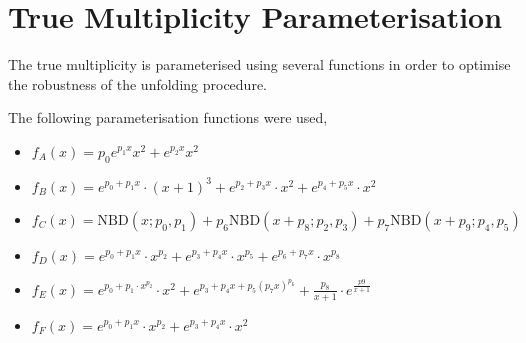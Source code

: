 \section{True Multiplicity Parameterisation}
\label{section: true multiplicity parameterisation}

The true multiplicity is parameterised using several functions in order to optimise the robustness of the unfolding procedure.

The following parameterisation functions were used,

\begin{itemize}
	\item $f_A(x) = p_0 e^{p_1x}x^2 + e^{p_2x}x^2$
	\item $f_B(x) = e^{p_0 + p_1x} \cdot (x + 1)^3 + e^{p_2 + p_3x} \cdot x^2 + e^{p_4 + p_5x} \cdot x^2$
	\item $f_C(x) = \mathrm{NBD}(x; p_0, p_1) + p_6 \mathrm{NBD}(x + p_8; p_2, p_3) + p_7 \mathrm{NBD}(x + p_9; p_4, p_5)$
	\item $f_D(x) = e^{p_0 + p_1x} \cdot x^{p_2} + e^{p_3 + p_4x} \cdot x^{p_5} + e^{p_6 + p_7x} \cdot x^{p_8}$
	\item $f_E(x) = e^{p_0 + p_1 \cdot x^{p_2}} \cdot x^2 + e^{p_3 + p_4x + p_5(p_7x)^{p_6}} + \frac{p_8}{x+1} \cdot e^\frac{p9}{x+1}$
	\item $f_F(x) = e^{p_0 + p_1x} \cdot x^{p_2} + e^{p_3 + p_4x} \cdot x^2$
\end{itemize}

%
%
%
%
%

